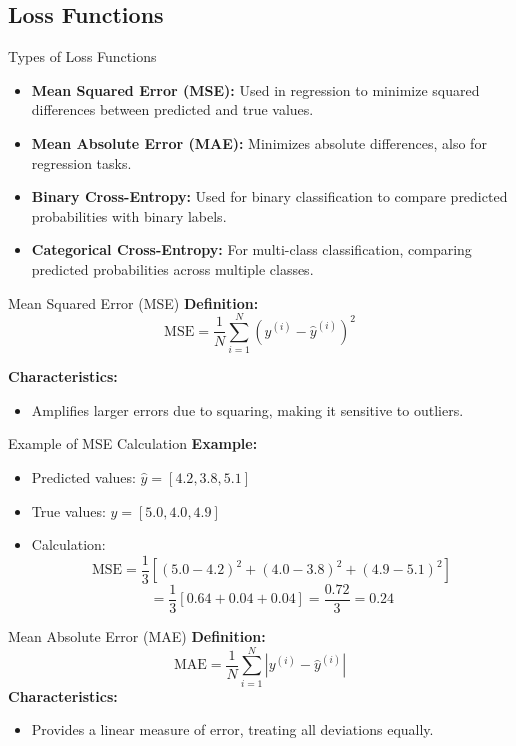 \documentclass[serif, aspectratio=169]{beamer}
\begin{document}
\subsection{Loss Functions}

\begin{frame}{Types of Loss Functions}
    \begin{itemize}
        \item \textbf{Mean Squared Error (MSE):} Used in regression to minimize squared differences between predicted and true values.
        \item \textbf{Mean Absolute Error (MAE):} Minimizes absolute differences, also for regression tasks.
        \item \textbf{Binary Cross-Entropy:} Used for binary classification to compare predicted probabilities with binary labels.
        \item \textbf{Categorical Cross-Entropy:} For multi-class classification, comparing predicted probabilities across multiple classes.
    \end{itemize}
\end{frame}

\begin{frame}{Mean Squared Error (MSE)}
    \textbf{Definition:}
\[
    \text{MSE} = \frac{1}{N} \sum_{i=1}^{N} \left( y^{(i)} - \hat{y}^{(i)} \right)^2
\]

    \textbf{Characteristics:}
    \begin{itemize}
        \item Amplifies larger errors due to squaring, making it sensitive to outliers.
    \end{itemize}
\end{frame}

\begin{frame}{Example of MSE Calculation}
    \textbf{Example:}
    \begin{itemize}
        \item Predicted values: \( \hat{y} = [4.2, 3.8, 5.1] \)
        \item True values: \( y = [5.0, 4.0, 4.9] \)
        \item Calculation:
        \[
        \text{MSE} = \frac{1}{3} \left[ (5.0 - 4.2)^2 + (4.0 - 3.8)^2 + (4.9 - 5.1)^2 \right]
        \]
        \[
        = \frac{1}{3} \left[ 0.64 + 0.04 + 0.04 \right] = \frac{0.72}{3} = 0.24
        \]
    \end{itemize}
\end{frame}

\begin{frame}{Mean Absolute Error (MAE)}
    \textbf{Definition:}
\[
    \text{MAE} = \frac{1}{N} \sum_{i=1}^{N} \left| y^{(i)} - \hat{y}^{(i)} \right|
\]
    \textbf{Characteristics:}
    \begin{itemize}
        \item Provides a linear measure of error, treating all deviations equally.
    \end{itemize}
\end{frame}
\end{document}
